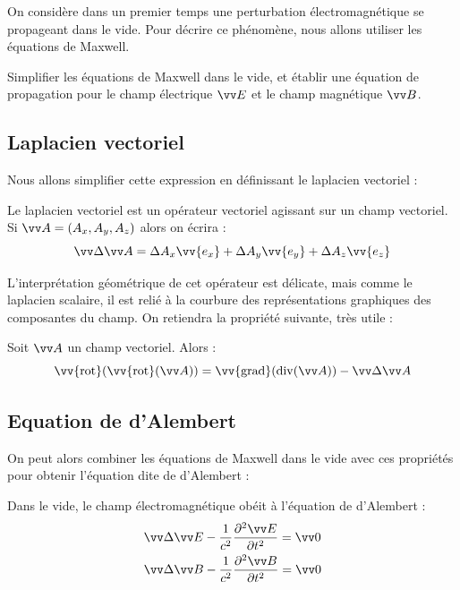 \documentclass[11pt,fleqn]{book} %
\renewcommand{\div}{\mathrm{div}}
\newcommand{\rot}{\vv{\mathrm{rot}}}
\renewcommand{\grad}{\vv{\mathrm{grad}}}
\begin{document}
On considère dans un premier temps une perturbation électromagnétique se propageant dans le vide. Pour décrire ce phénomène, nous allons utiliser les équations de Maxwell.

\begin{capex}
	Simplifier les équations de Maxwell dans le vide, et établir une équation de propagation pour le champ électrique $\vv E$ et le champ magnétique $\vv B$.
\end{capex}

\subsection{Laplacien vectoriel}

Nous allons simplifier cette expression en définissant le laplacien vectoriel :
\begin{definition}
	Le laplacien vectoriel est un opérateur vectoriel agissant sur un champ vectoriel. Si $\vv A = (A_x,A_y,A_z)$ alors on écrira :
	\begin{equation}
		\vv \Delta \vv A = \Delta A_x \vv{e_x} + \Delta A_y \vv{e_y} + \Delta A_z \vv{e_z}
	\end{equation}
\end{definition}
L'interprétation géométrique de cet opérateur est délicate, mais comme le laplacien scalaire, il est relié à la courbure des représentations graphiques des composantes du champ. On retiendra la propriété suivante, très utile :
\begin{proposition}
	Soit $\vv A$ un champ vectoriel. Alors :
	\begin{equation}
		\rot(\rot(\vv A)) = \grad(\div(\vv A)) - \vv \Delta \vv A
	\end{equation}
\end{proposition}

\subsection{Equation de d'Alembert}

On peut alors combiner les équations de Maxwell dans le vide avec ces propriétés pour obtenir l'équation dite de d'Alembert :
\begin{theorem}
	Dans le vide, le champ électromagnétique obéit à l'équation de d'Alembert :
	\begin{align}
		&\vv \Delta \vv E - \frac{1}{c^2} \frac{\partial^2 \vv E}{\partial t^2} = \vv 0\\
		&\vv \Delta \vv B - \frac{1}{c^2} \frac{\partial^2 \vv B}{\partial t^2} = \vv 0
	\end{align}
\end{theorem}
\end{document}
